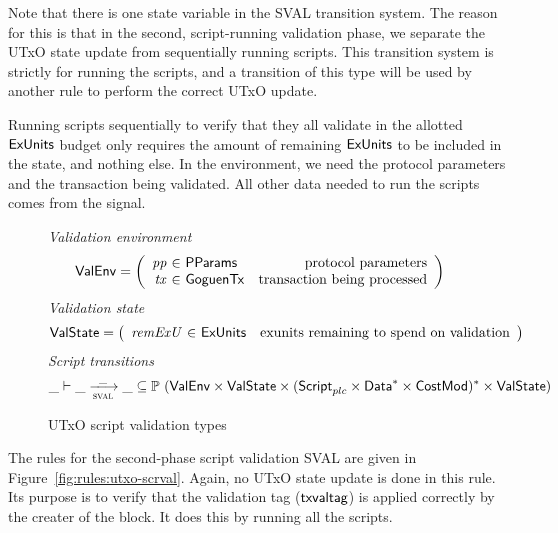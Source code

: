 Note that there is one state variable in the SVAL transition system. The reason
for this is that in the second, script-running validation phase, we separate
the UTxO state update from sequentially running scripts. This transition
system is strictly for running the scripts, and a transition of this type
will be used by another rule to perform the correct UTxO update.

Running scripts sequentially
to verify that they all validate in the allotted $\mathsf{ExUnits}$ budget only requires
the amount of remaining $\mathsf{ExUnits}$ to be included in the state, and nothing else.
In the environment, we need the protocol parameters and the
transaction being validated. All other data needed
to run the scripts comes from the signal.

\begin{figure}[htb]
  \emph{Validation environment}
  \begin{equation*}
    \ValEnv =
    \left(
      \begin{array}{r@{~\in~}lr}
        \var{pp} & \PParams & \text{protocol parameters}\\
        \var{tx} & \GoguenTx & \text{transaction being processed} \\
      \end{array}
    \right)
  \end{equation*}
  \emph{Validation state}
  \begin{equation*}
    \ValState =
    \left(
      \begin{array}{r@{~\in~}lr}
        \var{remExU} & \ExUnits & \text{exunits remaining to spend on validation} \\
      \end{array}
    \right)
  \end{equation*}
  \emph{Script transitions}
  \begin{equation*}
    \_ \vdash
    \var{\_} \trans{sval}{\_} \var{\_}
    \subseteq \powerset (\ValEnv \times \ValState \times \seqof{(\ScriptPlutus\times\seqof{\Data}\times\CostMod)} \times \ValState)
  \end{equation*}
  \caption{UTxO script validation types}
  \label{fig:ts-types:utxos}
\end{figure}

The rules for the second-phase script validation SVAL are given in
Figure~\ref{fig:rules:utxo-scrval}. Again, no UTxO state update
is done in this rule. Its purpose is to verify that the
validation tag ($\mathsf{txvaltag}$) is applied correctly by the creater of
the block. It does this by running all the scripts.

